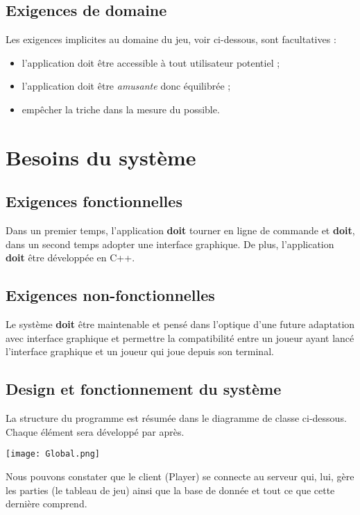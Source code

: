 \documentclass[12pt]{article}
\begin{document}
	\subsection{Exigences de domaine}
		Les exigences implicites au domaine du jeu, voir ci-dessous, sont facultatives :

		\begin{itemize}
			\item l'application doit être accessible à tout utilisateur potentiel ;
			\item l'application doit être \textit{amusante} donc équilibrée ;
			\item empêcher la triche dans la mesure du possible.
		\end{itemize}

\newpage

\section{Besoins du système}
	\subsection{Exigences fonctionnelles}
		Dans un premier temps, l'application \textbf{doit} tourner en ligne de commande et \textbf{doit}, dans un second temps adopter une interface
		graphique.
		De plus, l'application \textbf{doit} être développée en C++.

	\subsection{Exigences non-fonctionnelles}
		Le système \textbf{doit} être maintenable et pensé dans l'optique d'une future adaptation avec interface graphique et permettre la compatibilité entre un joueur ayant lancé l'interface graphique et un joueur qui joue depuis son terminal.

	\subsection{Design et fonctionnement du système}
		La structure du programme est résumée dans le diagramme de classe ci-dessous. Chaque élément sera développé par après.
		\begin{center}\texttt{[image: Global.png]}\end{center}

		Nous pouvons constater que le client (Player) se connecte au serveur qui, lui, gère les parties (le tableau de jeu) ainsi que la base de donnée et tout ce que cette dernière comprend.
\end{document}
